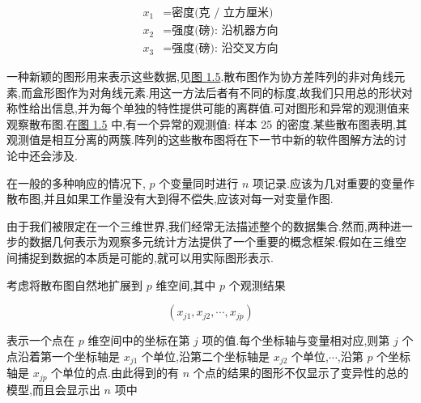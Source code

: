 
\[
\begin{aligned}
x_1 &= \text{密度(克 / 立方厘米)}\\
x_2 &= \text{强度(磅): 沿机器方向}\\
x_3 &= \text{强度(磅): 沿交叉方向}
\end{aligned}
\]

一种新颖的图形用来表示这些数据,见\hyperref[fig:1.5]{图 1.5}.散布图作为协方差阵列的非对角线元素,而盒形图作为对角线元素.用这一方法后者有不同的标度,故我们只用总的形状对称性给出信息,并为每个单独的特性提供可能的离群值.可对图形和异常的观测值来观察散布图.在\hyperref[fig:1.5]{图 1.5} 中,有一个异常的观测值: 样本 25 的密度.某些散布图表明,其观测值是相互分离的两簇.阵列的这些散布图将在下一节中新的软件图解方法的讨论中还会涉及.

\begin{mvfigure}
\label{fig:1.5}
\end{mvfigure}

在一般的多种响应的情况下, $p$ 个变量同时进行 $n$ 项记录.应该为几对重要的变量作散布图,并且如果工作量没有大到得不偿失,应该对每一对变量作图.

由于我们被限定在一个三维世界,我们经常无法描述整个的数据集合.然而,两种进一步的数据几何表示为观察多元统计方法提供了一个重要的概念框架.假如在三维空间捕捉到数据的本质是可能的,就可以用实际图形表示.

\quad 考虑将散布图自然地扩展到 $p$ 维空间,其中 $p$ 个观测结果

\[
(x_{j1}, x_{j2}, \cdots, x_{jp})
\]

表示一个点在 $p$ 维空间中的坐标在第 $j$ 项的值.每个坐标轴与变量相对应,则第 $j$ 个点沿着第一个坐标轴是 $x_{j1}$ 个单位,沿第二个坐标轴是 $x_{j2}$ 个单位,$\cdots$,沿第 $p$ 个坐标轴是 $x_{jp}$ 个单位的点.由此得到的有 $n$ 个点的结果的图形不仅显示了变异性的总的模型,而且会显示出 $n$ 项中
